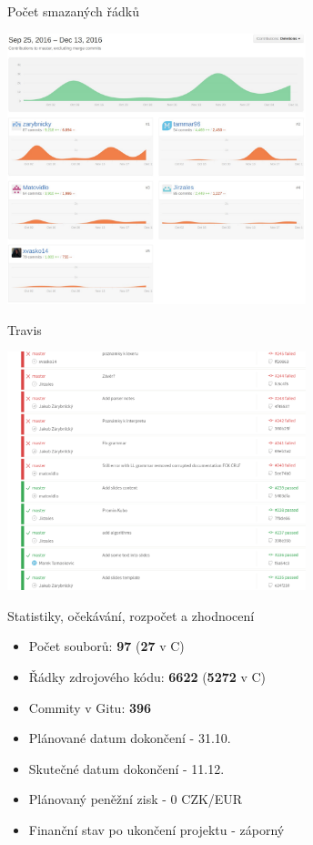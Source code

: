 \documentclass[13pt]{beamer}
\begin{document}
\begin{frame}{Počet smazaných řádků}
  \begin{center}
    \includegraphics[width=0.65\textwidth]{./img/git_del.pdf}
  \end{center}
\end{frame}

\begin{frame}{Travis}
  \begin{center}
    \includegraphics[width=0.65\textwidth]{./img/travis.pdf}
  \end{center}
\end{frame}

\begin{frame}{Statistiky, očekávání, rozpočet a zhodnocení}
\begin{itemize}
\item Počet souborů: \textbf{97} (\textbf{27} v C)
\item Řádky zdrojového kódu: \textbf{6622} (\textbf{5272} v C)
\item Commity v Gitu: \textbf{396}
\end{itemize}

\begin{itemize}
\item Plánované datum dokončení - 31.10.
\item Skutečné datum dokončení - 11.12.
\item Plánovaný peněžní zisk - 0 CZK/EUR
\item Finanční stav po ukončení projektu - záporný
\end{itemize}

\end{frame}
\end{document}
